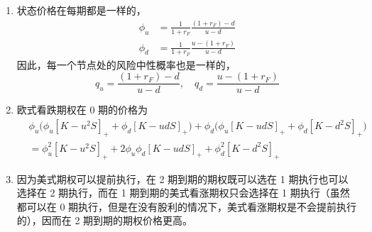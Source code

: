 \begin{solution}
\begin{enumerate}[label=(\alph*)]
    \item 状态价格在每期都是一样的，
    \[
        \begin{aligned}
            \phi_{u}&=\frac{1}{1+r_{F}}\frac{(1+r_{F})-d}{u-d}\\
            \phi_{d}&=\frac{1}{1+r_{F}}\frac{u-(1+r_{F})}{u-d}
        \end{aligned}
    \]
    因此，每一个节点处的风险中性概率也是一样的，
    \[
        q_{u}=\frac{(1+r_{F})-d}{u-d},\quad q_{d}=\frac{u-(1+r_{F})}{u-d}
    \]
    \item 欧式看跌期权在 0 期的价格为
    \[
        \begin{aligned}
            &\phi_{u}\bigl(\phi_{u}[K-u^{2}S]_{+}+\phi_{d}[K-udS]_{+}\bigr)+\phi_{d}\bigl(\phi_{u}[K-udS]_{+}+\phi_{d}[K-d^{2}S]_{+}\bigr)\\
            &=\phi_{u}^{2}[K-u^{2}S]_{+}+2\phi_{u}\phi_{d}[K-udS]_{+}+\phi_{d}^{2}[K-d^{2}S]_{+}
        \end{aligned}
    \]
    \item 因为美式期权可以提前执行，在 2 期到期的期权既可以选在 1 期执行也可以选择在 2 期执行，而在 1 期到期的美式看涨期权只会选择在 1 期执行（虽然都可以在 0 期执行，但是在没有股利的情况下，美式看涨期权是不会提前执行的），因而在 2 期到期的期权价格更高。
\end{enumerate}
\end{solution}

